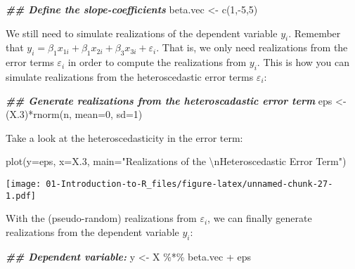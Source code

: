 \documentclass[
]{book}
\newenvironment{Shaded}{\begin{snugshade}}{\end{snugshade}}
\newcommand{\AttributeTok}[1]{\textcolor[rgb]{0.77,0.63,0.00}{#1}}
\newcommand{\DecValTok}[1]{\textcolor[rgb]{0.00,0.00,0.81}{#1}}
\newcommand{\DocumentationTok}[1]{\textcolor[rgb]{0.56,0.35,0.01}{\textbf{\textit{#1}}}}
\newcommand{\FloatTok}[1]{\textcolor[rgb]{0.00,0.00,0.81}{#1}}
\newcommand{\FunctionTok}[1]{\textcolor[rgb]{0.00,0.00,0.00}{#1}}
\newcommand{\NormalTok}[1]{#1}
\newcommand{\OtherTok}[1]{\textcolor[rgb]{0.56,0.35,0.01}{#1}}
\newcommand{\SpecialCharTok}[1]{\textcolor[rgb]{0.00,0.00,0.00}{#1}}
\newcommand{\StringTok}[1]{\textcolor[rgb]{0.31,0.60,0.02}{#1}}
\begin{document}
\begin{Shaded}
\begin{Highlighting}[]
\DocumentationTok{\#\# Define the slope{-}coefficients}
\NormalTok{beta.vec  }\OtherTok{\textless{}{-}} \FunctionTok{c}\NormalTok{(}\DecValTok{1}\NormalTok{,}\SpecialCharTok{{-}}\DecValTok{5}\NormalTok{,}\DecValTok{5}\NormalTok{)}
\end{Highlighting}
\end{Shaded}

\hfill\break
We still need to simulate realizations of the dependent variable \(y_i\). Remember that \(y_i=\beta_1 x_{1i}+\beta_1 x_{2i}+\beta_3 x_{3i}+\varepsilon_{i}\). That is, we only need realizations from the error terms \(\varepsilon_i\) in order to compute the realizations from \(y_i\). This is how you can simulate realizations from the heteroscedastic error terms \(\varepsilon_i\):

\begin{Shaded}
\begin{Highlighting}[]
\DocumentationTok{\#\# Generate realizations from the heteroscadastic error term}
\NormalTok{eps       }\OtherTok{\textless{}{-}}\NormalTok{ (X}\FloatTok{.3}\NormalTok{)}\SpecialCharTok{*}\FunctionTok{rnorm}\NormalTok{(n, }\AttributeTok{mean=}\DecValTok{0}\NormalTok{, }\AttributeTok{sd=}\DecValTok{1}\NormalTok{)}
\end{Highlighting}
\end{Shaded}

Take a look at the heteroscedasticity in the error term:

\begin{Shaded}
\begin{Highlighting}[]
\FunctionTok{plot}\NormalTok{(}\AttributeTok{y=}\NormalTok{eps, }\AttributeTok{x=}\NormalTok{X}\FloatTok{.3}\NormalTok{, }
     \AttributeTok{main=}\StringTok{"Realizations of the }\SpecialCharTok{\textbackslash{}n}\StringTok{Heteroscedastic Error Term"}\NormalTok{)}
\end{Highlighting}
\end{Shaded}

\texttt{[image: 01-Introduction-to-R\_files/figure-latex/unnamed-chunk-27-1.pdf]}

With the (pseudo-random) realizations from \(\varepsilon_i\), we can finally generate realizations from the dependent variable \(y_i\):

\begin{Shaded}
\begin{Highlighting}[]
\DocumentationTok{\#\# Dependent variable:}
\NormalTok{y   }\OtherTok{\textless{}{-}}\NormalTok{ X }\SpecialCharTok{\%*\%}\NormalTok{ beta.vec }\SpecialCharTok{+}\NormalTok{ eps}
\end{Highlighting}
\end{Shaded}
\end{document}
